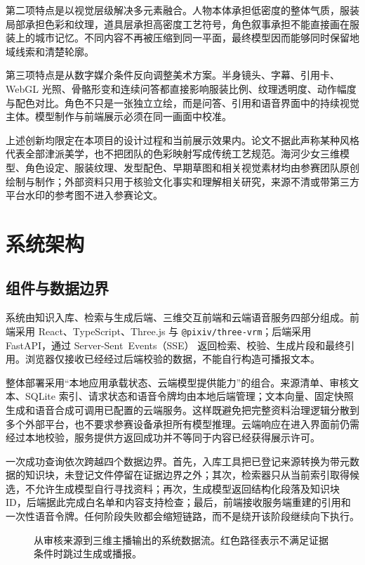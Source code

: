 \documentclass[UTF8,zihao=-4,fontset=none,twoside]{ctexart}
\newcommand{\code}[1]{\mbox{\texttt{#1}}\nobreak}
\begin{document}
第二项特点是以视觉层级解决多元素融合。人物本体承担低密度的整体气质，服装局部承担色彩和纹理，道具层承担高密度工艺符号，角色叙事承担不能直接画在服装上的城市记忆。不同内容不再被压缩到同一平面，最终模型因而能够同时保留地域线索和清楚轮廓。

第三项特点是从数字媒介条件反向调整美术方案。半身镜头、字幕、引用卡、WebGL 光照、骨骼形变和连续问答都直接影响服装比例、纹理透明度、动作幅度与配色对比。角色不只是一张独立立绘，而是问答、引用和语音界面中的持续视觉主体。模型制作与前端展示必须在同一画面中校准。

上述创新均限定在本项目的设计过程和当前展示效果内。论文不据此声称某种风格代表全部津派美学，也不把团队的色彩映射写成传统工艺规范。海河少女三维模型、角色设定、服装纹理、发型配色、早期草图和相关视觉素材均由参赛团队原创绘制与制作；外部资料只用于核验文化事实和理解相关研究，来源不清或带第三方平台水印的参考图不进入参赛论文。

\FloatBarrier

\section{系统架构}

\subsection{组件与数据边界}

系统由知识入库、检索与生成后端、三维交互前端和云端语音服务四部分组成。前端采用 React、TypeScript、Three.js 与 \code{@pixiv/three-vrm}\cite{threevrm}；后端采用 FastAPI，通过 \mbox{Server-Sent Events（SSE）} 返回检索、校验、生成片段和最终引用。浏览器仅接收已经经过后端校验的数据，不能自行构造可播报文本。

整体部署采用“本地应用承载状态、云端模型提供能力”的组合。来源清单、审核文本、SQLite 索引、请求状态和语音令牌均由本地后端管理；文本向量、固定快照生成和语音合成可调用已配置的云端服务。这样既避免把完整资料治理逻辑分散到多个外部平台，也不要求参赛设备承担所有模型推理。云端响应在进入界面前仍需经过本地校验，服务提供方返回成功并不等同于内容已经获得展示许可。

一次成功查询依次跨越四个数据边界。首先，入库工具把已登记来源转换为带元数据的知识块，未登记文件停留在证据边界之外；其次，检索器只从当前索引取得候选，不允许生成模型自行寻找资料；再次，生成模型返回结构化段落及知识块 ID，后端据此完成白名单和内容支持检查；最后，前端接收服务端重建的引用和一次性语音令牌。任何阶段失败都会缩短链路，而不是绕开该阶段继续向下执行。

\begin{figure}[htbp]
  \centering
  \resizebox{\linewidth}{!}{}
\caption{从审核来源到三维主播输出的系统数据流。红色路径表示不满足证据条件时跳过生成或播报。}
\label{fig:architecture}
\end{figure}
\end{document}

